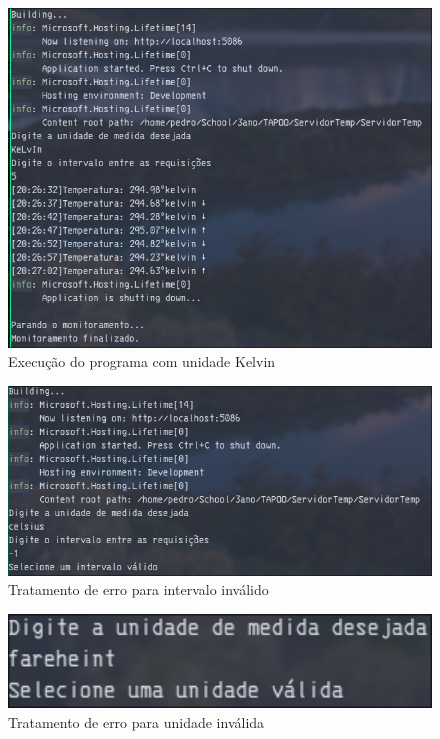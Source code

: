 \documentclass[
	12pt,				%
	oneside,			%
	a4paper,			%
	english,			%
	brazil,				%
	]{abntex2}
\begin{document}
{\begin{figure}[H]
    \centering
    \includegraphics[width=1\textwidth]{imgs/img3.png}
    \caption{Execução do programa com unidade Kelvin}
    \label{fig:img3}
\end{figure}

\begin{figure}[H]
    \centering
    \includegraphics[width=1\textwidth]{imgs/img4.png}
    \caption{Tratamento de erro para intervalo inválido}
    \label{fig:img4}
\end{figure}

\begin{figure}[H]
    \centering
    \includegraphics[width=1\textwidth]{imgs/img5.png}
    \caption{Tratamento de erro para unidade inválida}
    \label{fig:img5}
\end{figure}

}
\end{document}
